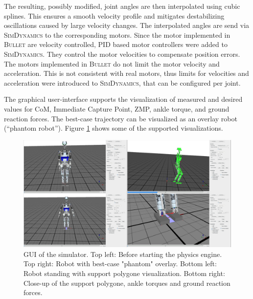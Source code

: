 \documentclass[english,ngerman]{KITreprt}
\newcommand{\name}[1]{\textsc{#1}}
\begin{document}
The resulting, possibly modified, joint angles are then interpolated
using cubic splines. This ensures a smooth velocity profile and
mitigates destabilizing oscillations caused by large velocity changes.
The interpolated angles are send via \name{SimDynamics} to the
corresponding motors. Since the motor implemented in \name{Bullet} are
velocity controlled, PID based motor controllers were added to
\name{SimDynamics}. They control the motor velocities to compensate
position errors. The motors implemented in \name{Bullet} do not limit
the motor velocity and acceleration. This is not consistent with real
motors, thus limits for velocities and acceleration were introduced to
\name{SimDynamics}, that can be configured per joint.

The graphical user-interface supports the visualization of measured and
desired values for CoM, Immediate Capture Point, ZMP, ankle torque, and
ground reaction forces. The best-case trajectory can be visualized as an
overlay robot (``phantom robot''). Figure \ref{img:simulator-thumbs}
shows some of the supported visualizations.

\begin{figure}[htb]
\vspace*{-1em}
\includegraphics[width=\textwidth]{images/simulator_thumbs.png}
\caption{GUI of the simulator. Top left: Before starting the physics engine. Top right: Robot with
best-case "phantom" overlay. Bottom left: Robot standing with support polygone visualization. Bottom right:
Close-up of the support polygone, ankle torques and ground reaction forces.}
\label{img:simulator-thumbs}
\end{figure}
\end{document}
